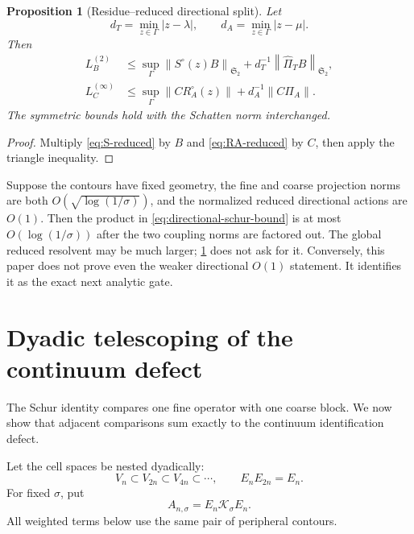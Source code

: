 \documentclass[11pt]{article}
\newtheorem{proposition}[theorem]{Proposition}
\theoremstyle{definition}
\theoremstyle{remark}
\newcommand{\cK}{\mathcal K}
\newcommand{\HS}{\mathfrak S_2}
\newcommand{\norm}[1]{\left\lVert #1\right\rVert}
\begin{document}
\begin{proposition}[Residue--reduced directional split]
\label{prop:residue-reduced}
Let
\begin{equation}
 d_T=\min_{z\in\Gamma}|z-\lambda|,
 \qquad
 d_A=\min_{z\in\Gamma}|z-\mu|.
 \label{eq:pole-distances}
\end{equation}
Then
\begin{align}
 L_B^{(2)}
 &\le
 \sup_\Gamma\norm{S^\circ(z)B}_{\HS}
 +d_T^{-1}\norm{\widehat\Pi_TB}_{\HS},
 \label{eq:left-reduced-bound}\\
 L_C^{(\infty)}
 &\le
 \sup_\Gamma\norm{CR_A^\circ(z)}
 +d_A^{-1}\norm{C\Pi_A}.
 \label{eq:right-reduced-bound}
\end{align}
The symmetric bounds hold with the Schatten norm interchanged.
\end{proposition}

\begin{proof}
Multiply \eqref{eq:S-reduced} by $B$ and
\eqref{eq:RA-reduced} by $C$, then apply the triangle inequality.
\end{proof}

Suppose the contours have fixed geometry, the fine and coarse projection
norms are both $O(\sqrt{\log(1/\sigma)})$, and the normalized reduced
directional actions are $O(1)$.  Then the product in
\eqref{eq:directional-schur-bound} is at
most $O(\log(1/\sigma))$ after the two coupling norms are factored out.  The
global reduced resolvent may be much larger; \cref{prop:residue-reduced}
does not ask for it.  Conversely, this paper does not prove even the weaker
directional $O(1)$ statement.  It identifies it as the exact next analytic
gate.

\section{Dyadic telescoping of the continuum defect}
\label{sec:dyadic}

The Schur identity compares one fine operator with one coarse block.  We now
show that adjacent comparisons sum exactly to the continuum identification
defect.

Let the cell spaces be nested dyadically:
\begin{equation}
 V_n\subset V_{2n}\subset V_{4n}\subset\cdots,
 \qquad
 E_nE_{2n}=E_n.
 \label{eq:nested-spaces}
\end{equation}
For fixed $\sigma$, put
\begin{equation}
 A_{n,\sigma}=E_n\cK_\sigma E_n.
 \label{eq:An}
\end{equation}
All weighted terms below use the same pair of peripheral contours.
\end{document}
